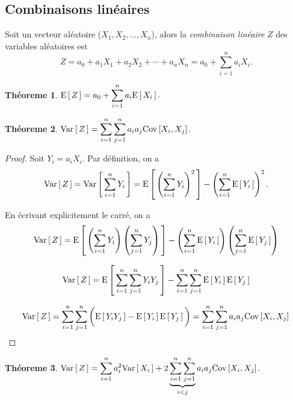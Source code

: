\documentclass[11pt]{article}
\newcommand\Esp[1]{%
	\ensuremath{%
		\mathrm{E}\left[\,#1\,\right]%
	}%
}%
\newcommand\Var[1]{%
	\ensuremath{%
		\mathrm{Var}\left[\,#1\,\right]%
	}%
}%
\newcommand\Cov[2]{%
	\ensuremath{%
		\mathrm{Cov}\left[#1,#2\right]%
	}%
}%
\newtheorem{theoreme}{Théoreme}[section]
\begin{document}
\subsection{Combinaisons linéaires}
\begin{definition}
	Soit un vecteur aléatoire ($X_1,X_2,\dots,X_n$), alors la
	\textit{combinaison linéaire} $Z$ des variables aléatoires est
	\begin{equation*}
		Z=a_0+a_1X_1+a_2X_2+\cdots+a_nX_n=a_0+\sum_{i=1}^na_iX_i.
	\end{equation*}
\end{definition}

\begin{theoreme}
	$\Esp{Z}=a_0+\displaystyle\sum_{i=1}^na_i\Esp{X_i}$.
\end{theoreme}

\begin{theoreme}
	$\Var{Z}=\displaystyle\sum_{i=1}^n\displaystyle\sum_{j=1}^na_ia_j
	\Cov{X_i}{X_j}$.
\end{theoreme}
\begin{proof}
	Soit $Y_i=a_iX_i$. Par définition, on a
	\begin{equation*}
		\Var{Z}
		=\Var{\sum_{i=1}^nY_i}
		=\Esp{\left(\sum_{i=1}^nY_i\right)^2}
		-\left(\sum_{i=1}^n\Esp{Y_i}\right)^2.
	\end{equation*}

	En écrivant explicitement le carré, on a
	\begin{equation*}
		\Var{Z}
		=\Esp{\left(\sum_{i=1}^nY_i\right)\left(\sum_{j=1}^nY_j\right)}
		-\left(\sum_{i=1}^n\Esp{Y_i}\right)\left(\sum_{j=1}^n\Esp{Y_j}\right)
	\end{equation*}

	\begin{equation*}
		\Var{Z}
		=\Esp{\sum_{i=1}^n\sum_{j=1}^nY_iY_j}
		-\sum_{i=1}^n\sum_{j=1}^n\Esp{Y_i}\Esp{Y_j}
	\end{equation*}

	\begin{equation*}
		\Var{Z}
		=\sum_{i=1}^n\sum_{j=1}^n\bigg(
			\Esp{Y_iY_j}-\Esp{Y_i}\Esp{Y_j}\bigg)
		=\sum_{i=1}^n\sum_{j=1}^na_ia_j\Cov{X_i}{X_j}
		\qedhere
	\end{equation*}
\end{proof}

\begin{theoreme}
	$\Var{Z}=
	\displaystyle\sum_{i=1}^na_i^2\Var{X_i}+
	2\underbrace{\displaystyle\sum_{i=1}^n\displaystyle\sum_{j=1}^n}_{i<j}
	a_ia_j\Cov{X_i}{X_j}$.
\end{theoreme}
\end{document}
